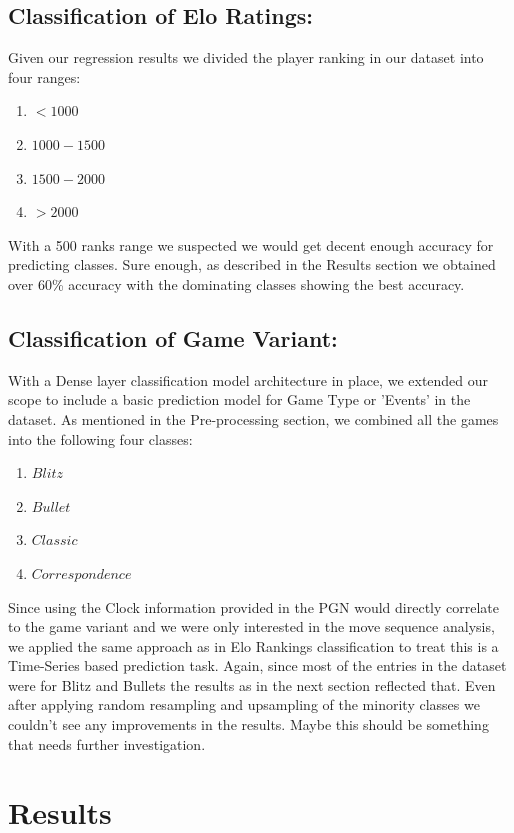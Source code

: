 \documentclass[11pt,a4paper]{article}
\begin{document}
\subsection{Classification of Elo Ratings:}
Given our regression results we divided the player ranking in our dataset into four ranges:
\begin{enumerate}
    \item $<1000$
    \item $1000-1500$
    \item $1500-2000$
    \item $>2000$
\end{enumerate}
With a 500 ranks range we suspected we would get decent enough accuracy for predicting classes. Sure enough, as described in the Results section we obtained over 60\% accuracy with the dominating classes showing the best accuracy.\\


\subsection{Classification of Game Variant:}
With a Dense layer classification model architecture in place, we extended our scope to include a basic prediction model for Game Type or 'Events' in the dataset. As mentioned in the Pre-processing section, we combined all the games into the following four classes:
\begin{enumerate}
    \item $Blitz$
    \item $Bullet$
    \item $Classic$
    \item $Correspondence$
\end{enumerate}
Since using the Clock information provided in the PGN would directly correlate to the game variant and we were only interested in the move sequence analysis, we applied the same approach as in Elo Rankings classification to treat this is a Time-Series based prediction task. Again, since most of the entries in the dataset were for Blitz and Bullets the results as in the next section reflected that. Even after applying random resampling and upsampling of the minority classes we couldn't see any improvements in the results. Maybe this should be something that needs further investigation.

\section{Results}
\end{document}
